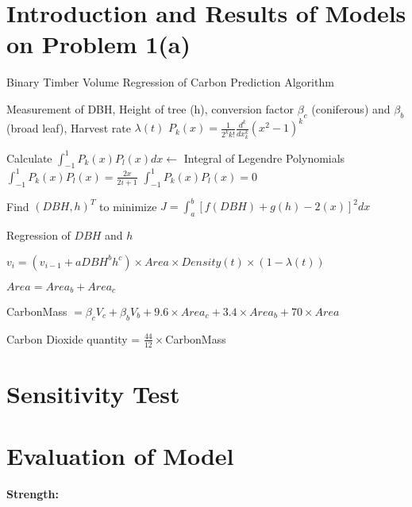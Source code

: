 \documentclass{mcmthesis}
\numberwithin{figure}{section}
\numberwithin{table}{section}
\numberwithin{equation}{section}
\begin{document}
\section{Introduction and Results of Models on Problem 1(a)}


\begin{algorithm}[htbp]
    \caption{Binary Timber Volume Regression of Carbon Prediction Algorithm} %
    \begin{algorithmic}[1]
      \Require
        Measurement of DBH, Height of tree (h), conversion factor 
        $ \beta_c $  (coniferous) and $ \beta_b $ (broad leaf), Harvest rate $ \lambda(t) $ 
        $ P_k(x) = \frac{1}{2^kk!}\frac{d^k}{dx_k^k}(x^2-1)^k $

        \quad \quad Calculate $ \int_{-1}^{1}P_k(x)P_l(x)dx \gets $ Integral of Legendre Polynomials
        $ \int_{-1}^1P_k(x)P_l(x) = \frac{2x}{2i+1} $
        \Else $ \int_{-1}^1P_k(x)P_l(x) = 0 $   
        \EndIf 
        \EndFor
        \EndFor
        \EndFor
        
        Find $ (DBH, h)^T $ to minimize  $ J = \int_a^b[f(DBH)+g(h)-2(x)]^2dx $

        Regression of $ DBH $ and $ h $  

        $ v_i = (v_{i-1}+aDBH^bh^c)\times Area\times Density(t) \times (1-\lambda(t)) $ 
        \EndFor 

        $ Area = Area_b + Area_c $ 

         CarbonMass $= \beta_cV_c+\beta_bV_b+9.6\times Area_c+3.4\times Area_b + 70\times Area$ 

        \Ensure
        Carbon Dioxide quantity = $ \frac{44}{12} \times $CarbonMass 
    \end{algorithmic}
  \end{algorithm}
  


\section{Sensitivity Test}

\section{Evaluation of Model}

\textbf{Strength:}
\end{document}
